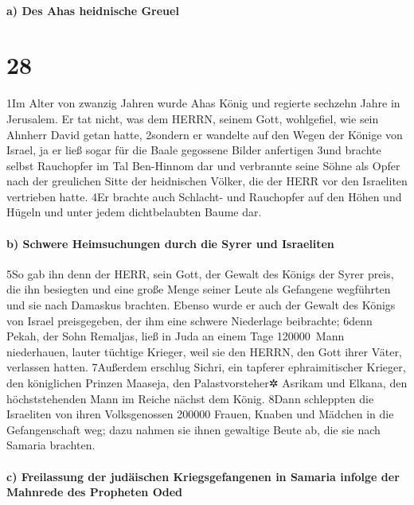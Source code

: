 \hypertarget{a-des-ahas-heidnische-greuel}{%
\paragraph{a) Des Ahas heidnische
Greuel}\label{a-des-ahas-heidnische-greuel}}

\hypertarget{section-27}{%
\section{28}\label{section-27}}

1Im Alter von zwanzig Jahren wurde Ahas König und regierte sechzehn
Jahre in Jerusalem. Er tat nicht, was dem HERRN, seinem Gott,
wohlgefiel, wie sein Ahnherr David getan hatte, 2sondern er wandelte auf
den Wegen der Könige von Israel, ja er ließ sogar für die Baale
gegossene Bilder anfertigen 3und brachte selbst Rauchopfer im Tal
Ben-Hinnom dar und verbrannte seine Söhne als Opfer nach der greulichen
Sitte der heidnischen Völker, die der HERR vor den Israeliten vertrieben
hatte. 4Er brachte auch Schlacht- und Rauchopfer auf den Höhen und
Hügeln und unter jedem dichtbelaubten Baume dar.

\hypertarget{b-schwere-heimsuchungen-durch-die-syrer-und-israeliten}{%
\paragraph{b) Schwere Heimsuchungen durch die Syrer und
Israeliten}\label{b-schwere-heimsuchungen-durch-die-syrer-und-israeliten}}

5So gab ihn denn der HERR, sein Gott, der Gewalt des Königs der Syrer
preis, die ihn besiegten und eine große Menge seiner Leute als Gefangene
wegführten und sie nach Damaskus brachten. Ebenso wurde er auch der
Gewalt des Königs von Israel preisgegeben, der ihm eine schwere
Niederlage beibrachte; 6denn Pekah, der Sohn Remaljas, ließ in Juda an
einem Tage 120000~Mann niederhauen, lauter tüchtige Krieger, weil sie
den HERRN, den Gott ihrer Väter, verlassen hatten. 7Außerdem erschlug
Sichri, ein tapferer ephraimitischer Krieger, den königlichen Prinzen
Maaseja, den Palastvorsteher✲ Asrikam und Elkana, den höchststehenden
Mann im Reiche nächst dem König. 8Dann schleppten die Israeliten von
ihren Volksgenossen 200000 Frauen, Knaben und Mädchen in die
Gefangenschaft weg; dazu nahmen sie ihnen gewaltige Beute ab, die sie
nach Samaria brachten.

\hypertarget{c-freilassung-der-juduxe4ischen-kriegsgefangenen-in-samaria-infolge-der-mahnrede-des-propheten-oded}{%
\paragraph{c) Freilassung der judäischen Kriegsgefangenen in Samaria
infolge der Mahnrede des Propheten
Oded}\label{c-freilassung-der-juduxe4ischen-kriegsgefangenen-in-samaria-infolge-der-mahnrede-des-propheten-oded}}

